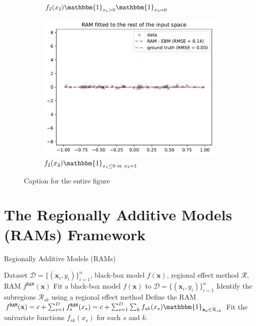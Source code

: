 \documentclass[12pt]{article}
\newcommand{\xc}{\mathbf{x_c}}
\newcommand{\when}[1]{\mathbbm{1}_{#1}}
\begin{document}
\begin{figure}[htbp]
\begin{subfigure}{0.32\textwidth}
        \caption{$f_2(x_2) \when{x_1 > 0} \when{x_3=0}$}
        \label{subfig:regional_gam_1}
    \end{subfigure}
    \begin{subfigure}{0.32\textwidth}
        \centering
        \includegraphics[width=\textwidth]{figures/regional_gam_subreg_2.pdf}
        \caption{$f_2(x_2) \when{x_1 \leq 0 \text{ or } x_3 = 1}$}
        \label{subfig:regional_gam_2}
    \end{subfigure}
    \caption{Caption for the entire figure}
    \label{fig:ram_example}
\end{figure}


\section{The Regionally Additive Models (RAMs) Framework}


\begin{algorithm}
\caption{Regionally Additive Models (RAMs)}
\label{alg:ram}
\begin{algorithmic}[1]
\REQUIRE Dataset $\mathcal{D} = \{(\mathbf{x}_i, y_i)\}_{i=1}^n$, black-box model $f(\mathbf{x})$, regional effect method $\mathcal{R}$, RAM $f^{\mathtt{RAM}}(\mathbf{x})$
\STATE Fit a black-box model $f(\mathbf{x})$ to $\mathcal{D} = \{(\mathbf{x}_i, y_i)\}_{i=1}^n$
\STATE Identify the subregions $\mathcal{R}_{sk}$ using a regional effect method
\STATE Define the RAM $f^{\mathtt{RAM}}(\mathbf{x}) = c + \sum_{s=1}^D f^{\mathtt{RAM}}_s(x_s) = c + \sum_{s=1}^D \sum_k f_{sk}(x_s) \when{\xc \in \mathcal{R}_{sk}}$
\STATE Fit the univariate functions $f_{sk}(x_s)$ for each $s$ and $k$.
\end{algorithmic}
\end{algorithm}
\end{document}
